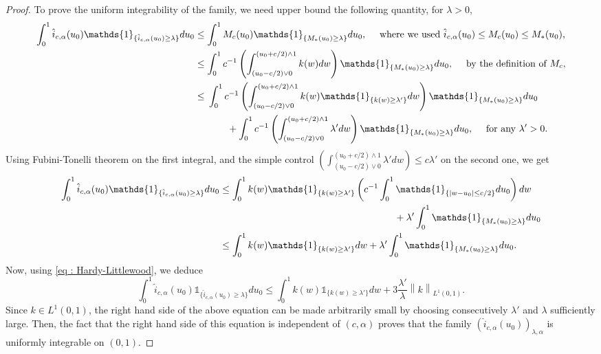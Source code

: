\documentclass[a4paper, 11pt]{article}
\theoremstyle{definition}
\newcommand{\norm}[1]{\left\|{#1}\right\|}
\newcommand{\indi}[1]{\mathds{1}_{#1}}
\DeclarePairedDelimiter{\abs}{\lvert}{\rvert}
\begin{document}
{\begin{proof}
To prove the uniform integrability of the family, we need upper bound the following quantity, for $\lambda >0$,
\begin{align*}
	\int_0^1 \hat{i}_{c,\alpha}(u_0) \indi{\{\hat{i}_{c,\alpha}(u_0) \ge \lambda\}} du_0
&	\le 
	\int_0^1 M_c(u_0) \indi{\{M_*(u_0) \ge \lambda\}} du_0,	\quad \text{ where we used $	\hat{i}_{c,\alpha}(u_0)   \le M_c(u_0) \le M_*(u_0)$,}
\\
& \le \int_0^1 c^{-1} \left( \int_{(u_0-c/2)\vee 0}^{(u_0+c/2) \wedge 1} k(w)dw  \right)  \indi{\{M_*(u_0) \ge \lambda\}}  du_0, 
\quad \text{ by the definition of $M_c$,}
\\
&\le 
\begin{multlined}[t]
	\int_0^1 c^{-1} \left( \int_{(u_0-c/2)\vee 0}^{(u_0+c/2) \wedge 1} k(w) \indi{\{k(w) \ge \lambda'\}} dw  \right)  \indi{\{M_*(u_0) \ge \lambda\}}  du_0
	\\+
	\int_0^1 c^{-1} \left( \int_{(u_0-c/2)\vee 0}^{(u_0+c/2) \wedge 1} \lambda'dw  \right)  \indi{\{M_*(u_0) \ge \lambda\}}  du_0, 
	\quad \text{ for any $\lambda'>0$.}
\end{multlined}
\end{align*}
Using Fubini-Tonelli theorem on the first integral, and the simple control $\left( \int_{(u_0-c/2)\vee 0}^{(u_0+c/2) \wedge 1} \lambda'dw  \right) \le c \lambda'$ on the second one, we get
\begin{align*}
		\int_0^1 \hat{i}_{c,\alpha}(u_0) 
		\indi{\{\hat{i}_{c,\alpha}(u_0) \ge \lambda\}} du_0
	&
	\begin{multlined}[t]
		\le \int_0^1  k(w)\indi{\{k(w) \ge \lambda'\}}  \left( c^{-1}\int_0^1  
	\indi{\{\abs{w-u_0}\le c/2\}} du_0 \right)dw
	\\+	
	\lambda' \int_0^1  \indi{\{M_*(u_0) \ge \lambda\}}  du_0 
	\end{multlined}
	\\
& \le  \int_0^1  k(w)\indi{\{k(w) \ge \lambda'\}} dw +
\lambda' \int_0^1  \indi{\{M_*(u_0) \ge \lambda\}}  du_0 .
\end{align*}
Now, using \eqref{eq : Hardy-Littlewood}, we deduce
\begin{equation*}
			\int_0^1 \hat{i}_{c,\alpha}(u_0) \indi{\{\hat{i}_{c,\alpha}(u_0) \ge \lambda\}} du_0 \le  \int_0^1  k(w)\indi{\{k(w) \ge \lambda'\}} dw+3\frac{\lambda'}{\lambda} \norm{k}_{L^1(0,1)}.
\end{equation*}
Since $k \in L^1(0,1)$, the right hand side of the above equation can be made arbitrarily small by choosing  consecutively $\lambda'$ and $\lambda$ sufficiently large. Then, the fact that the right hand side of this equation is independent of $(c,\alpha)$ proves that the family $  (\hat{i}_{c,\alpha}(u_0))_{\lambda,\alpha} $ is uniformly integrable on $(0,1)$.
\end{proof}













}
\end{document}
